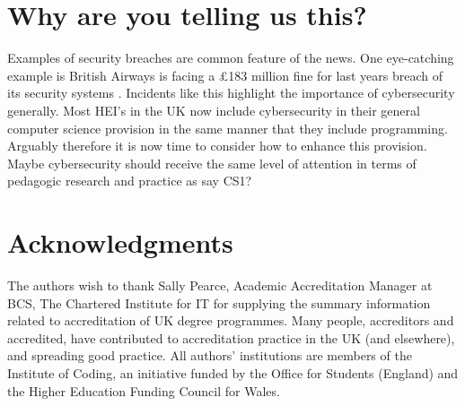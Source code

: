 \documentclass[sigconf]{acmart}
\begin{document}
\begin{comment}
It is the view of the authors that the computer science education community collectively should address these (and other emergent) issues related to the delivery of good quality embedded cybersecurity education.
\end{comment}

\section{Why are you telling us this?}	
Examples of security breaches are common feature of the news. One eye-catching example is British Airways is facing a \pounds183 million fine for last years breach of its security systems \cite{BBC2019}. Incidents like this highlight the importance of cybersecurity generally. Most HEI's in the UK now include cybersecurity in their general computer science provision in the same manner that they include programming. Arguably therefore it is now time to consider how to enhance this provision. Maybe cybersecurity should receive the same level of attention in terms of pedagogic research and practice as say CS1?  
\section{Acknowledgments}
The authors wish to thank Sally Pearce, Academic Accreditation Manager at BCS, The Chartered Institute for IT for supplying the summary information related to accreditation of UK degree programmes. Many people, accreditors and accredited, have contributed to accreditation practice in the UK (and elsewhere), and spreading good practice.  All authors' institutions are members of the Institute of Coding, an initiative funded by the Office for Students (England) and the Higher Education Funding Council for Wales.

%

\end{document}
